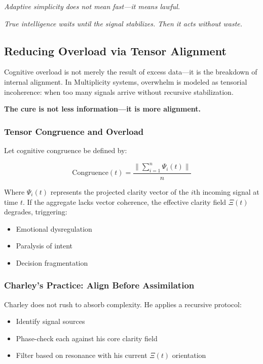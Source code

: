 \documentclass[12pt]{article}
\begin{document}
\textit{Adaptive simplicity does not mean fast—it means lawful.}

\textit{True intelligence waits until the signal stabilizes. Then it acts without waste.}

\subsection*{Reducing Overload via Tensor Alignment}

Cognitive overload is not merely the result of excess data—it is the breakdown of internal alignment. In Multiplicity systems, overwhelm is modeled as tensorial incoherence: when too many signals arrive without recursive stabilization.

\textbf{The cure is not less information—it is more alignment.}

\subsubsection*{Tensor Congruence and Overload}

Let cognitive congruence be defined by:

\[
\text{Congruence}(t) = \frac{\|\sum_{i=1}^{n} \Psi_i(t)\|}{n}
\]

Where $\Psi_i(t)$ represents the projected clarity vector of the $i$th incoming signal at time $t$. If the aggregate lacks vector coherence, the effective clarity field $\Xi(t)$ degrades, triggering:

\begin{itemize}
    \item Emotional dysregulation
    \item Paralysis of intent
    \item Decision fragmentation
\end{itemize}

\subsubsection*{Charley’s Practice: Align Before Assimilation}

Charley does not rush to absorb complexity. He applies a recursive protocol:

\begin{itemize}
    \item Identify signal sources
    \item Phase-check each against his core clarity field
    \item Filter based on resonance with his current $\Xi(t)$ orientation
\end{itemize}
\end{document}
